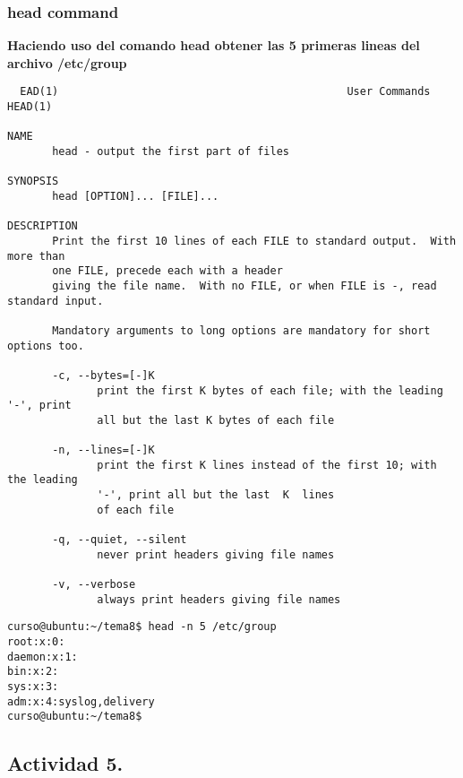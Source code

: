 \documentclass[a4paper,11pt,spanish]{article} %
\newenvironment{myscriptlisting}
{\begin{list}{}{\setlength{\leftmargin}{1em}}\item\scriptsize\bfseries}
{\end{list}}
\begin{document}
\subsubsection{head command}

\textbf{Haciendo uso del comando head obtener las 5 primeras lineas del archivo /etc/group}

\begin{myscriptlisting}
 \begin{verbatim}
  EAD(1)                                             User Commands                                             HEAD(1)

NAME
       head - output the first part of files

SYNOPSIS
       head [OPTION]... [FILE]...

DESCRIPTION
       Print the first 10 lines of each FILE to standard output.  With more than
       one FILE, precede each with a header
       giving the file name.  With no FILE, or when FILE is -, read standard input.

       Mandatory arguments to long options are mandatory for short options too.

       -c, --bytes=[-]K
              print the first K bytes of each file; with the leading '-', print
              all but the last K bytes of each file

       -n, --lines=[-]K
              print the first K lines instead of the first 10; with the leading 
              '-', print all but the last  K  lines
              of each file

       -q, --quiet, --silent
              never print headers giving file names

       -v, --verbose
              always print headers giving file names
 \end{verbatim}
\end{myscriptlisting}


\begin{myscriptlisting}
 \begin{verbatim}
curso@ubuntu:~/tema8$ head -n 5 /etc/group
root:x:0:
daemon:x:1:
bin:x:2:
sys:x:3:
adm:x:4:syslog,delivery
curso@ubuntu:~/tema8$ 
 \end{verbatim}
\end{myscriptlisting}


\subsection{Actividad 5.}
\end{document}
